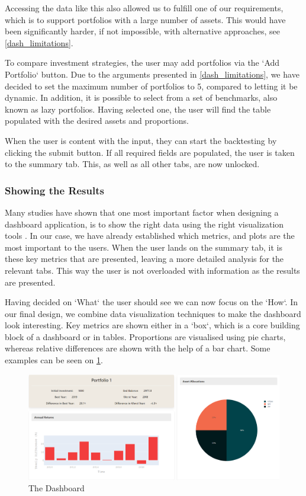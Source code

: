 \documentclass[main.tex]{subfiles}
\begin{document}
Accessing the data like this also allowed us to fulfill one of our requirements, which is to support portfolios with a large number of assets. This would have been significantly harder, if not impossible, with alternative approaches, see \ref{dash_limitations}.

To compare investment strategies, the user may add portfolios via the `Add Portfolio` button. Due to the arguments presented in \ref{dash_limitations}, we have decided to set the maximum number of portfolios to 5, compared to letting it be dynamic. In addition, it is possible to select from a set of benchmarks, also known as lazy portfolios. Having selected one, the user will find the table populated with the desired assets and proportions. 

When the user is content with the input, they can start the backtesting by clicking the submit button. If all required fields are populated, the user is taken to the summary tab. This, as well as all other tabs, are now unlocked.

\subsubsection*{Showing the Results}

Many studies have shown that one most important factor when designing a dashboard application, is to show the right data using the right visualization tools \cite{dashboard_design1} \cite{dashboard_design2}. In our case, we have already established which metrics, and plots are the most important to the users. When the user lands on the summary tab, it is these key metrics that are presented, leaving a more detailed analysis for the relevant tabs. This way the user is not overloaded with information as the results are presented. 

Having decided on `What` the user should see we can now focus on the `How`. In our final design, we combine data visualization techniques to make the dashboard look interesting. Key metrics are shown either in a `box`, which is a core building block of a dashboard or in tables. Proportions are visualised using pie charts, whereas relative differences are shown with the help of a bar chart. Some examples can be seen on \figurename{\ref{dashboard}}.

\begin{figure}[H]
   \centering
   \includegraphics[width=\textwidth]{04Design/04Pictures/dashboard.png}
   \caption{The Dashboard}
   \label{dashboard}
\end{figure}
\end{document}
